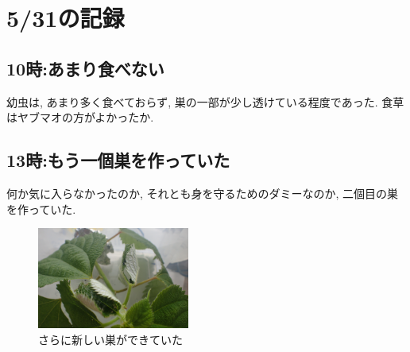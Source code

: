 \documentclass{jsarticle}
\begin{document}
\section{5/31の記録}
\subsection{10時:あまり食べない}
幼虫は, あまり多く食べておらず, 巣の一部が少し透けている程度であった. 食草はヤブマオの方がよかったか. 

\subsection{13時:もう一個巣を作っていた}
何か気に入らなかったのか, それとも身を守るためのダミーなのか, 二個目の巣を作っていた. 

\begin{figure}[htbp]
  \begin{center}
    \includegraphics[width=5cm]{photo2/Larva-nest.JPG}
  \end{center}
  \caption{さらに新しい巣ができていた}
\end{figure}
\end{document}
